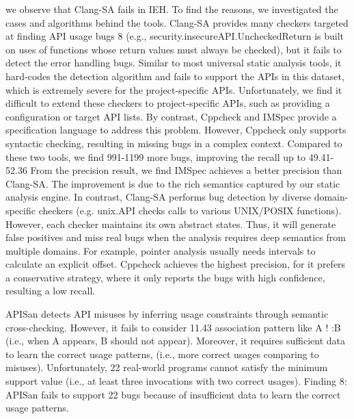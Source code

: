 we observe that Clang-SA fails in IEH. To find
the reasons, we investigated the cases and algorithms behind
the tools. Clang-SA provides many checkers targeted at finding
API usage bugs 8 (e.g., security.insecureAPI.UncheckedReturn
is built on uses of functions whose return values must always
be checked), but it fails to detect the error handling bugs.
Similar to most universal static analysis tools, it hard-codes
the detection algorithm and fails to support the APIs in this
dataset, which is extremely severe for the project-specific
APIs. Unfortunately, we find it difficult to extend these checkers
to project-specific APIs, such as providing a configuration
or target API lists. By contrast, Cppcheck and IMSpec provide
a specification language to address this problem. However, Cppcheck
only supports syntactic checking, resulting in missing
bugs in a complex context. Compared to these two tools, we
find 991-1199 more bugs, improving the recall up to 49.41-
52.36%
From the precision result, we find IMSpec achieves a better
precision than Clang-SA. The improvement is due to the rich
semantics captured by our static analysis engine. In contrast,
Clang-SA performs bug detection by diverse domain-specific
checkers (e.g. unix.API checks calls to various UNIX/POSIX
functions). However, each checker maintains its own abstract
states. Thus, it will generate false positives and miss real
bugs when the analysis requires deep semantics from multiple
domains. For example, pointer analysis usually needs intervals
to calculate an explicit offset. Cppcheck achieves the highest
precision, for it prefers a conservative strategy, where it only
reports the bugs with high confidence, resulting a low recall.

APISan detects API misuses by inferring usage constraints
through semantic cross-checking. However, it fails to consider
11.43%
association pattern like A ! :B (i.e., when A appears, B
should not appear). Moreover, it requires sufficient data to
learn the correct usage patterns, (i.e., more correct usages
comparing to misuses). Unfortunately, 22%
real-world programs cannot satisfy the minimum support value
(i.e., at least three invocations with two correct usages).
Finding 8: APISan fails to support 22%
bugs because of insufficient data to learn the
correct usage patterns.

